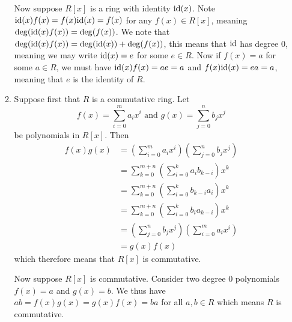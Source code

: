 \begin{enumerate}
\begin{enumerate}[label=(\alph*)]
        Now suppose $R[x]$ is a ring with identity $\mathrm{id}(x)$. Note $\mathrm{id}(x)f(x) = f(x)\mathrm{id}(x) = f(x)$ for any $f(x) \in R[x]$, meaning $\deg(\mathrm{id}(x)f(x)) = \deg(f(x))$. We note that $\deg(\mathrm{id}(x)f(x)) = \deg(\mathrm{id}(x)) + \deg(f(x))$, this means that $\mathrm{id}$ has degree 0, meaning we may write $\mathrm{id}(x) = e$ for some $e \in R$. Now if $f(x) = a$ for some $a \in R$, we must have $\mathrm{id}(x)f(x) = ae = a$ and $f(x)\mathrm{id}(x) = ea = a$, meaning that $e$ is the identity of $R$.
        
        \item Suppose first that $R$ is a commutative ring. Let
        \[
            f(x) = \sum_{i=0}^ma_ix^i \text{ and } g(x) = \sum_{j=0}^nb_jx^j
        \]
        be polynomials in $R[x]$. Then
        \begin{align*}
            f(x)g(x) &= \left(\sum_{i=0}^ma_ix^i\right)\left(\sum_{j=0}^nb_jx^j\right)\\
            &= \sum_{k=0}^{m+n}\left(\sum_{i=0}^k a_{i}b_{k-i}\right)x^k\\
            &= \sum_{k=0}^{m+n}\left(\sum_{i=0}^k b_{k-i}a_{i}\right)x^k\\
            &= \sum_{k=0}^{m+n}\left(\sum_{i=0}^k b_{i}a_{k-i}\right)x^k\\
            &= \left(\sum_{j=0}^nb_jx^j\right)\left(\sum_{i=0}^ma_ix^i\right)\\
            &= g(x)f(x)
        \end{align*}
        which therefore means that $R[x]$ is commutative.

        Now suppose $R[x]$ is commutative. Consider two degree 0 polynomials $f(x) = a$ and $g(x) = b$. We thus have $ab = f(x)g(x) = g(x)f(x) = ba$ for all $a,b \in R$ which means $R$ is commutative.
    \end{enumerate}
\end{enumerate}

